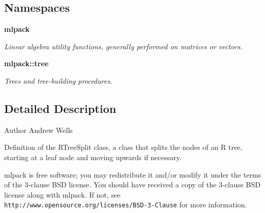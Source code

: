 \subsection*{Namespaces}
\begin{DoxyCompactItemize}
\item 
 {\bf mlpack}
\begin{DoxyCompactList}\small\item\em Linear algebra utility functions, generally performed on matrices or vectors. \end{DoxyCompactList}\item 
 {\bf mlpack\+::tree}
\begin{DoxyCompactList}\small\item\em Trees and tree-\/building procedures. \end{DoxyCompactList}\end{DoxyCompactItemize}


\subsection{Detailed Description}
\begin{DoxyAuthor}{Author}
Andrew Wells
\end{DoxyAuthor}
Definition of the R\+Tree\+Split class, a class that splits the nodes of an R tree, starting at a leaf node and moving upwards if necessary.

mlpack is free software; you may redistribute it and/or modify it under the terms of the 3-\/clause B\+SD license. You should have received a copy of the 3-\/clause B\+SD license along with mlpack. If not, see {\tt http\+://www.\+opensource.\+org/licenses/\+B\+S\+D-\/3-\/\+Clause} for more information. 